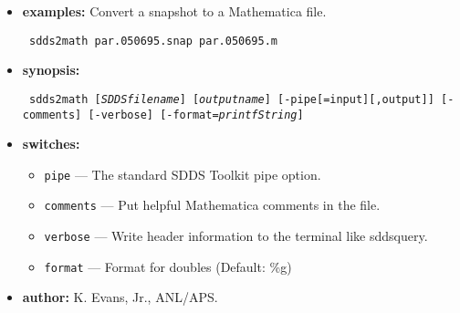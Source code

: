 \begin{itemize}
\item {\bf examples:}  
Convert a snapshot to a Mathematica file. 
\begin{flushleft}{\tt 
sdds2math par.050695.snap par.050695.m 
}\end{flushleft} 
 
\item {\bf synopsis:}  
\begin{flushleft}{\tt 
sdds2math [{\em SDDSfilename}] [{\em outputname}]  
   [-pipe[=input][,output]] [-comments] [-verbose] 
   [-format={\em printfString}] 
}\end{flushleft} 
 
\item {\bf switches:} 
    \begin{itemize} 
    \item \verb|pipe| --- The standard SDDS Toolkit pipe option. 
    \item \verb|comments| --- Put helpful Mathematica comments in the file. 
    \item \verb|verbose| --- Write header information to the terminal like sddsquery. 
    \item \verb|format| --- Format for doubles (Default: \%g) 
    \end{itemize} 
\item {\bf author:} K. Evans, Jr., ANL/APS. 
\end{itemize} 
 
